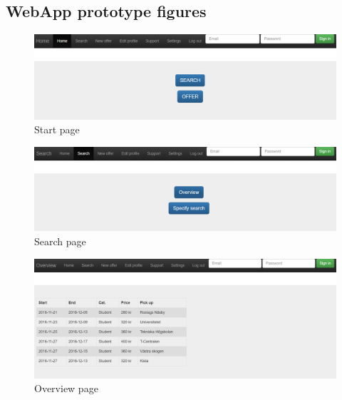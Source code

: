 \documentclass[11pt,twoside,a4paper]{report}
\begin{document}
\begin{appendices}
\chapter{WebApp prototype figures}
\label{webapp-prototype-appendix}
\thispagestyle{empty}
\newpage

\begin{figure}
	\centering
	\includegraphics[width=\textwidth]{png/webapp-start.png}
	\caption{Start page}
	\label{figure:start-page}
\end{figure}

\begin{figure}
	\centering
	\includegraphics[width=\textwidth]{png/webapp-search.png}
	\caption{Search page}
	\label{figure:search-page}
\end{figure}

\begin{figure}
	\centering
	\includegraphics[width=\textwidth]{png/webapp-overview.png}
	\caption{Overview page}
	\label{figure:overview-page}
\end{figure}


\end{appendices}
\end{document}
